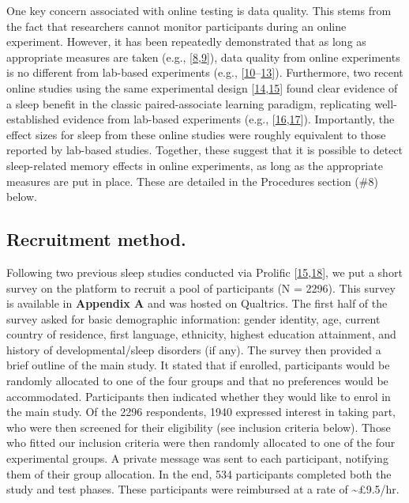\documentclass[
]{article}
\begin{document}
One key concern associated with online testing is data quality. This stems from the fact that researchers cannot monitor participants during an online experiment. However, it has been repeatedly demonstrated that as long as appropriate measures are taken (e.g., {[}\protect\hyperlink{ref-rodd2019a}{8},\protect\hyperlink{ref-curtis2022a}{9}{]}), data quality from online experiments is no different from lab-based experiments (e.g., {[}\protect\hyperlink{ref-anwyl-irvine2020a}{10}--\protect\hyperlink{ref-mak2021b}{13}{]}). Furthermore, two recent online studies using the same experimental design {[}\protect\hyperlink{ref-ashton2021a}{14},\protect\hyperlink{ref-mak2023a}{15}{]} found clear evidence of a sleep benefit in the classic paired-associate learning paradigm, replicating well-established evidence from lab-based experiments (e.g., {[}\protect\hyperlink{ref-lo2014a}{16},\protect\hyperlink{ref-plihal1997a}{17}{]}). Importantly, the effect sizes for sleep from these online studies were roughly equivalent to those reported by lab-based studies. Together, these suggest that it is possible to detect sleep-related memory effects in online experiments, as long as the appropriate measures are put in place. These are detailed in the Procedures section (\#8) below.

\hypertarget{recruitment-method.}{%
\subsection{Recruitment method.}\label{recruitment-method.}}

Following two previous sleep studies conducted via Prolific {[}\protect\hyperlink{ref-mak2023a}{15},\protect\hyperlink{ref-mak2023b}{18}{]}, we put a short survey on the platform to recruit a pool of participants (N = 2296). This survey is available in \textbf{Appendix A} and was hosted on Qualtrics. The first half of the survey asked for basic demographic information: gender identity, age, current country of residence, first language, ethnicity, highest education attainment, and history of developmental/sleep disorders (if any). The survey then provided a brief outline of the main study. It stated that if enrolled, participants would be randomly allocated to one of the four groups and that no preferences would be accommodated. Participants then indicated whether they would like to enrol in the main study. Of the 2296 respondents, 1940 expressed interest in taking part, who were then screened for their eligibility (see inclusion criteria below). Those who fitted our inclusion criteria were then randomly allocated to one of the four experimental groups. A private message was sent to each participant, notifying them of their group allocation. In the end, 534 participants completed both the study and test phases. These participants were reimbursed at a rate of \textasciitilde£9.5/hr.
\end{document}
